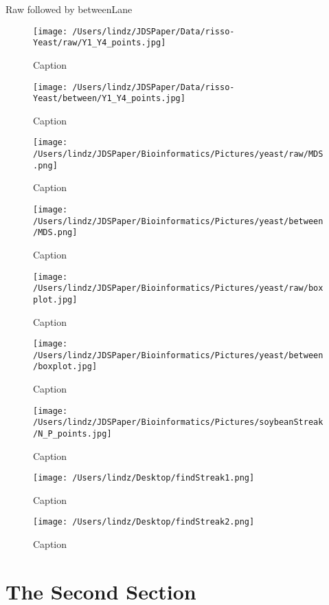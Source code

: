 \documentclass[preprint,12pt]{elsarticle}
\begin{document}
Raw followed by betweenLane

\begin{figure}[h]
\centering\texttt{[image: /Users/lindz/JDSPaper/Data/risso-Yeast/raw/Y1\_Y4\_points.jpg]}
\caption{Caption}
\end{figure}

\begin{figure}[h]
\centering\texttt{[image: /Users/lindz/JDSPaper/Data/risso-Yeast/between/Y1\_Y4\_points.jpg]}
\caption{Caption}
\end{figure}

\begin{figure}[h]
\centering\texttt{[image: /Users/lindz/JDSPaper/Bioinformatics/Pictures/yeast/raw/MDS.png]}
\caption{Caption}
\end{figure}

\begin{figure}[h]
\centering\texttt{[image: /Users/lindz/JDSPaper/Bioinformatics/Pictures/yeast/between/MDS.png]}
\caption{Caption}
\end{figure}

\begin{figure}[h]
\centering\texttt{[image: /Users/lindz/JDSPaper/Bioinformatics/Pictures/yeast/raw/boxplot.jpg]}
\caption{Caption}
\end{figure}

\begin{figure}[h]
\centering\texttt{[image: /Users/lindz/JDSPaper/Bioinformatics/Pictures/yeast/between/boxplot.jpg]}
\caption{Caption}
\end{figure}

\begin{figure}[h]
\centering\texttt{[image: /Users/lindz/JDSPaper/Bioinformatics/Pictures/soybeanStreak/N\_P\_points.jpg]}
\caption{Caption}
\end{figure}

\begin{figure}[h]
\centering\texttt{[image: /Users/lindz/Desktop/findStreak1.png]}
\caption{Caption}
\end{figure}

\begin{figure}[h]
\centering\texttt{[image: /Users/lindz/Desktop/findStreak2.png]}
\caption{Caption}
\end{figure}


\section{The Second Section}
\label{S:2}
\end{document}
